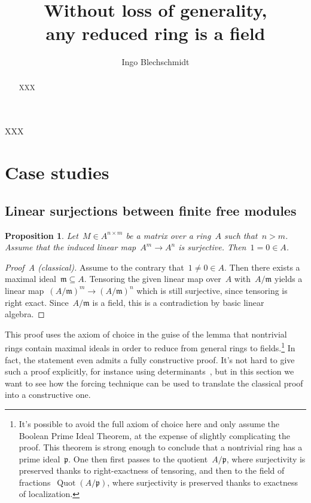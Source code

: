 \documentclass{amsart}
\title{Without loss of generality, \\ any reduced ring is a field}
\author{Ingo Blechschmidt}
\theoremstyle{definition}
\theoremstyle{plain}
\newtheorem{prop}[defn]{Proposition}
\theoremstyle{remark}
\newcommand{\mmm}{\mathfrak{m}}
\newcommand{\ppp}{\mathfrak{p}}
\DeclareMathOperator{\Quot}{Quot}
\newcommand{\?}{\,{:}\,}
\begin{document}
\begin{abstract}
  XXX
\end{abstract}

\maketitle
\thispagestyle{empty}

\noindent
XXX


\section{Case studies}

\subsection{Linear surjections between finite free modules}

\begin{prop}\label{surjection}
Let~$M \in A^{n \times m}$ be a matrix over a ring~$A$ such that~$n
> m$. Assume that the induced linear map~$A^m \to A^n$ is surjective. Then~$1 =
0 \in A$.
\end{prop}

\begin{proof}[Proof~A (classical)]Assume to the contrary that~$1 \neq 0 \in A$.
Then there exists a maximal ideal~$\mmm \subseteq A$. Tensoring the given linear map
over~$A$ with~$A/\mmm$ yields a linear map~$(A/\mmm)^m \to (A/\mmm)^n$ which is
still surjective, since tensoring is right exact. Since~$A/\mmm$ is a field,
this is a contradiction by basic linear algebra.
\end{proof}

This proof uses the axiom of choice in the guise of the lemma that nontrivial
rings contain maximal ideals in order to reduce from general rings to
fields.\footnote{It's possible to avoid the full axiom of choice here and only
assume the Boolean Prime Ideal Theorem, at the expense of slightly complicating
the proof. This theorem is strong enough to conclude that a nontrivial ring has
a prime ideal~$\ppp$. One then first passes to the quotient~$A/\ppp$, where
surjectivity is preserved thanks to right-exactness of tensoring, and then to
the field of fractions~$\Quot(A/\ppp)$, where surjectivity is preserved thanks
to exactness of localization.} In fact, the statement even admits a fully
constructive proof. It's not hard to give such a proof explicitly, for instance
using determinants~\cite{richman:trivial-rings}, but in this section we want to
see how the forcing technique can be used to translate the classical proof into
a constructive one.
\end{document}
